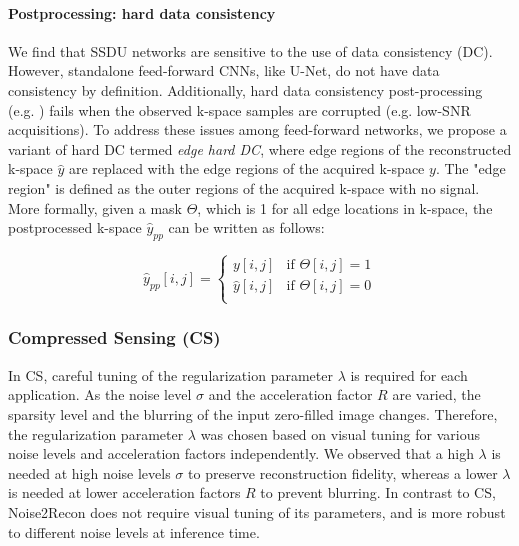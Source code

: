 \documentclass[10pt,twocolumn,letterpaper]{article}
\newcommand{\RV}[1]{{#1}}
\begin{document}
\RV{\paragraph{Postprocessing: hard data consistency} We find that SSDU networks are sensitive to the use of data consistency (DC). However, standalone feed-forward CNNs, like U-Net, do not have data consistency by definition. Additionally, hard data consistency post-processing (e.g. \cite{darestani2021accelerated}) fails when the observed k-space samples are corrupted (e.g. low-SNR acquisitions). To address these issues among feed-forward networks, we propose a variant of hard DC termed \textit{edge hard DC}, where edge regions of the reconstructed k-space $\hat{y}$ are replaced with the edge regions of the acquired k-space $y$. The "edge region" is defined as the outer regions of the acquired k-space with no signal. More formally, given a mask $\Theta$, which is 1 for all edge locations in k-space, the postprocessed k-space $\hat{y}_{pp}$ can be written as follows:

\begin{equation*}
    \hat{y}_{pp}[i,j] = \begin{cases}
        y[i,j] & \text{if } \Theta[i,j]=1\\
        \hat{y}[i,j] & \text{if } \Theta[i,j]=0\\
    \end{cases}
\end{equation*}
}

\subsubsection{Compressed Sensing (CS)}
\label{app:compressed-sensing-implementation} 
In CS, careful tuning of the regularization parameter $\lambda$ is required for each application. As the noise level $\sigma$ and the acceleration factor $R$ are varied, the sparsity level and the blurring of the input zero-filled image changes. Therefore, the regularization parameter $\lambda$ was chosen based on visual tuning for various noise levels and acceleration factors independently. We observed that a high $\lambda$ is needed at high noise levels $\sigma$ to preserve reconstruction fidelity, whereas a lower $\lambda$ is needed at lower acceleration factors $R$ to prevent blurring. In contrast to CS, Noise2Recon does not require visual tuning of its parameters, and is more robust to different noise levels at inference time.

\end{document}
